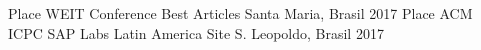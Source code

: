 \begin{cvhonors}
  \cvhonor
    { Place}
    {WEIT Conference Best Articles}
    {Santa Maria, Brasil}
    {2017}
  \cvhonor
    { Place}
    {ACM ICPC SAP Labs Latin America Site}
    {S. Leopoldo, Brasil}
    {2017}
\end{cvhonors}
